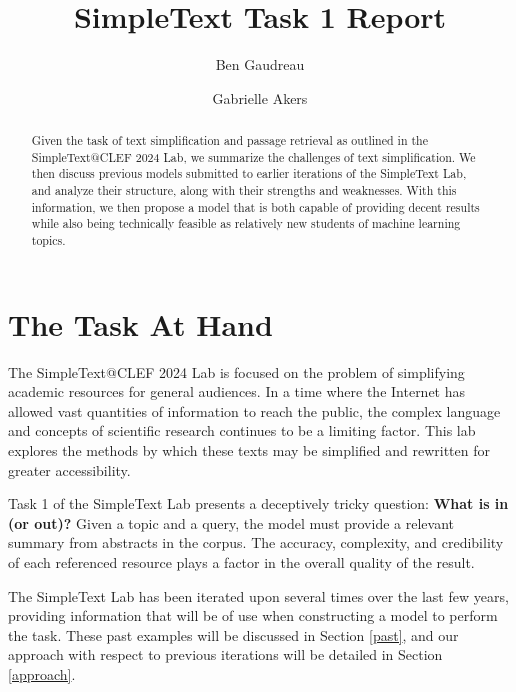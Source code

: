 \documentclass[runningheads]{llncs}
\begin{document}
%
\title{SimpleText Task 1 Report}
%
%
\author{Ben Gaudreau \and
Gabrielle Akers}
%
%
%
\maketitle              %
%
\begin{abstract}
Given the task of text simplification and passage retrieval as outlined in the SimpleText@CLEF 2024 Lab, we summarize the challenges of text simplification. We then discuss previous models submitted to earlier iterations of the SimpleText Lab, and analyze their structure, along with their strengths and weaknesses. With this information, we then propose a model that is both capable of providing decent results while also being technically feasible as relatively new students of machine learning topics.
\end{abstract}
%
%
%
\section{The Task At Hand} \label{intro}
The SimpleText@CLEF 2024 Lab is focused on the problem of simplifying academic resources for general audiences. In a time where the Internet has allowed vast quantities of information to reach the public, the complex language and concepts of scientific research continues to be a limiting factor\cite{clef}. This lab explores the methods by which these texts may be simplified and rewritten for greater accessibility.

Task 1 of the SimpleText Lab presents a deceptively tricky question: \textbf{What is in (or out)?} Given a topic and a query, the model must provide a relevant summary from abstracts in the corpus\cite{clef}. The accuracy, complexity, and credibility of each referenced resource plays a factor in the overall quality of the result.

The SimpleText Lab has been iterated upon several times over the last few years, providing information that will be of use when constructing a model to perform the task. These past examples will be discussed in Section \ref{past}, and our approach with respect to previous iterations will be detailed in Section \ref{approach}.
\end{document}
